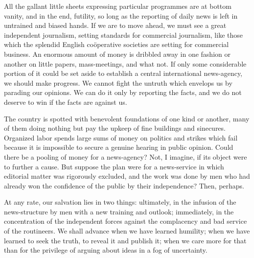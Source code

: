 \documentclass[openany,nobib,nohyper]{tufte-book}
\begin{document}
All the gallant little sheets expressing particular programmes are at
bottom vanity, and in the end, futility, so long as the reporting of
daily news is left in untrained and biased hands. If we are to move
ahead, we must see a great independent journalism, setting standards for
commercial journalism, like those which the splendid English coöperative
societies are setting for commercial business. An enormous amount of
money is dribbled away in one fashion or another on little papers,
mass-meetings, and what not. If only some considerable portion of it
could be set aside to establish a central international news-agency, we
should make progress. We cannot fight the untruth which envelops us by
parading our opinions. We can do it only by reporting the facts, and we
do not deserve to win if the facts are against us.

The country is spotted with benevolent foundations of one kind or
another, many of them doing nothing but pay the upkeep of fine buildings
and sinecures. Organized labor spends large sums of money on politics
and strikes which fail because it is impossible to secure a genuine
hearing in public opinion. Could there be a pooling of money for a
news-agency? Not, I imagine, if its object were to further a cause. But
suppose the plan were for a news-service in which editorial matter was
rigorously excluded, and the work was done by men who had already won
the confidence of the public by their independence? Then, perhaps.

At any rate, our salvation lies in two things: ultimately, in the
infusion of the news-structure by men with a new training and outlook;
immediately, in the concentration of the independent forces against the
complacency and bad service of the routineers. We shall advance when we
have learned humility; when we have learned to seek the truth, to reveal
it and publish it; when we care more for that than for the privilege of
arguing about ideas in a fog of uncertainty.
\end{document}
